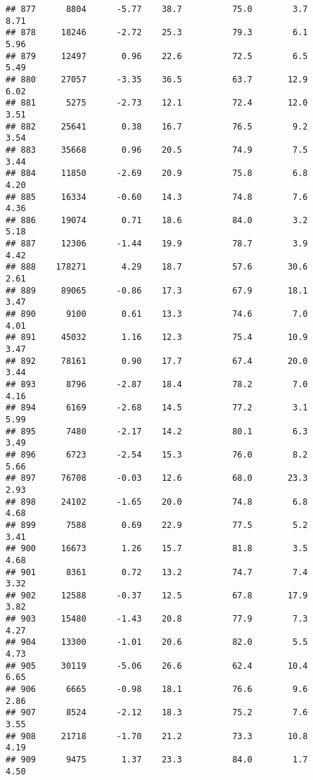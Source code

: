 \documentclass[
]{article}
\begin{document}
\begin{verbatim}
## 877      8804      -5.77    38.7          75.0        3.7              8.71
## 878     18246      -2.72    25.3          79.3        6.1              5.96
## 879     12497       0.96    22.6          72.5        6.5              5.49
## 880     27057      -3.35    36.5          63.7       12.9              6.02
## 881      5275      -2.73    12.1          72.4       12.0              3.51
## 882     25641       0.38    16.7          76.5        9.2              3.54
## 883     35668       0.96    20.5          74.9        7.5              3.44
## 884     11850      -2.69    20.9          75.8        6.8              4.20
## 885     16334      -0.60    14.3          74.8        7.6              4.36
## 886     19074       0.71    18.6          84.0        3.2              5.18
## 887     12306      -1.44    19.9          78.7        3.9              4.42
## 888    178271       4.29    18.7          57.6       30.6              2.61
## 889     89065      -0.86    17.3          67.9       18.1              3.47
## 890      9100       0.61    13.3          74.6        7.0              4.01
## 891     45032       1.16    12.3          75.4       10.9              3.47
## 892     78161       0.90    17.7          67.4       20.0              3.44
## 893      8796      -2.87    18.4          78.2        7.0              4.16
## 894      6169      -2.68    14.5          77.2        3.1              5.99
## 895      7480      -2.17    14.2          80.1        6.3              3.49
## 896      6723      -2.54    15.3          76.0        8.2              5.66
## 897     76708      -0.03    12.6          68.0       23.3              2.93
## 898     24102      -1.65    20.0          74.8        6.8              4.68
## 899      7588       0.69    22.9          77.5        5.2              3.41
## 900     16673       1.26    15.7          81.8        3.5              4.68
## 901      8361       0.72    13.2          74.7        7.4              3.32
## 902     12588      -0.37    12.5          67.8       17.9              3.82
## 903     15480      -1.43    20.8          77.9        7.3              4.27
## 904     13300      -1.01    20.6          82.0        5.5              4.73
## 905     30119      -5.06    26.6          62.4       10.4              6.65
## 906      6665      -0.98    18.1          76.6        9.6              2.86
## 907      8524      -2.12    18.3          75.2        7.6              3.55
## 908     21718      -1.70    21.2          73.3       10.8              4.19
## 909      9475       1.37    23.3          84.0        1.7              4.50

\end{verbatim}
\end{document}
